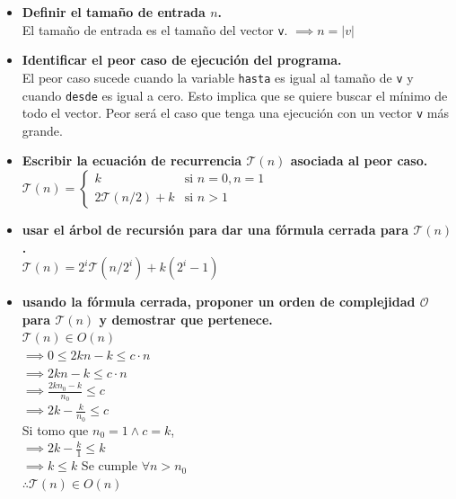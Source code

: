 \documentclass[12 pt]{article}
\begin{document}
    \begin{itemize}
        \item \textbf{Definir el tamaño de entrada $n$.} \\
            El tamaño de entrada es el tamaño del vector \texttt{v}. $\implies n = |v|$
        \item \textbf{Identificar el peor caso de ejecución del programa.} \\
            El peor caso sucede cuando la variable \texttt{hasta} es igual al tamaño de \texttt{v} y cuando \texttt{desde} es igual a cero. Esto implica que se quiere buscar el mínimo de todo el vector. Peor será el caso que tenga una ejecución con un vector \texttt{v} más grande.
        \item \textbf{Escribir la ecuación de recurrencia $\mathcal{T}(n)$ asociada al peor caso.} \\
            \(
                \mathcal{T}(n) =
                \begin{cases} 
                  k & \text{si } n = 0, n = 1 \\
                  2 \mathcal{T}(n/2) + k & \text{si } n > 1
                \end{cases}
            \)
        \item \textbf{usar el árbol de recursión para dar una fórmula cerrada para $\mathcal{T}(n)$.} \\
            \(\mathcal{T}(n) = 2^{i}\mathcal{T}(n/2^{i})+k(2^{i}-1)\)
        \item \textbf{usando la fórmula cerrada, proponer un orden de complejidad $\mathcal{O}$ para $\mathcal{T}(n)$ y demostrar que pertenece.} \\
            \(\mathcal{T}(n) \in O(n)\)\\
            \(\implies 0 \leq 2kn - k \leq c \cdot n\) \\
            \(\implies 2kn - k \leq c \cdot n\) \\
            \(\implies \frac{2kn_{0} - k}{n_{0}} \leq c\) \\
            \(\implies 2k -\frac{k}{n_{0}} \leq c\) \\
            Si tomo que \(n_{0} = 1 \wedge c = k\), \\
            \(\implies 2k -\frac{k}{1} \leq k\) \\
            \(\implies k \leq k\) Se cumple \(\forall n > n_{0}\) \\
            \(\therefore \mathcal{T}(n) \in O(n)\) \\
            
    \end{itemize}
\end{document}
